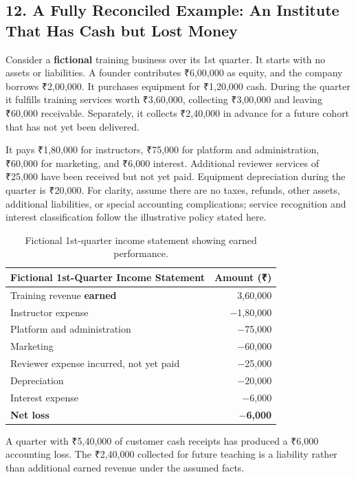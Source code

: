\subsection*{12. A Fully Reconciled Example: An Institute That Has Cash but Lost Money}

Consider a \textbf{fictional} training business over its 1st quarter. It starts with no assets or liabilities. A founder contributes ₹6,00,000 as equity, and the company borrows ₹2,00,000. It purchases equipment for ₹1,20,000 cash. During the quarter it fulfills training services worth ₹3,60,000, collecting ₹3,00,000 and leaving ₹60,000 receivable. Separately, it collects ₹2,40,000 in advance for a future cohort that has not yet been delivered.

It pays ₹1,80,000 for instructors, ₹75,000 for platform and administration, ₹60,000 for marketing, and ₹6,000 interest. Additional reviewer services of ₹25,000 have been received but not yet paid. Equipment depreciation during the quarter is ₹20,000. For clarity, assume there are no taxes, refunds, other assets, additional liabilities, or special accounting complications; service recognition and interest classification follow the illustrative policy stated here.

\begin{table}[htbp]
\centering
\small
\begin{tabularx}{\columnwidth}{Xr}
\toprule
\textbf{Fictional 1st-Quarter Income Statement} & \textbf{Amount (₹)} \\
\midrule
Training revenue \textbf{earned} & 3,60,000 \\
Instructor expense & $-$1,80,000 \\
Platform and administration & $-$75,000 \\
Marketing & $-$60,000 \\
Reviewer expense incurred, not yet paid & $-$25,000 \\
Depreciation & $-$20,000 \\
Interest expense & $-$6,000 \\
\midrule
\textbf{Net loss} & \textbf{$-$6,000} \\
\bottomrule
\end{tabularx}
\caption{Fictional 1st-quarter income statement showing earned performance.}
\end{table}

A quarter with ₹5,40,000 of customer cash receipts has produced a ₹6,000 accounting loss. The ₹2,40,000 collected for future teaching is a liability rather than additional earned revenue under the assumed facts.

